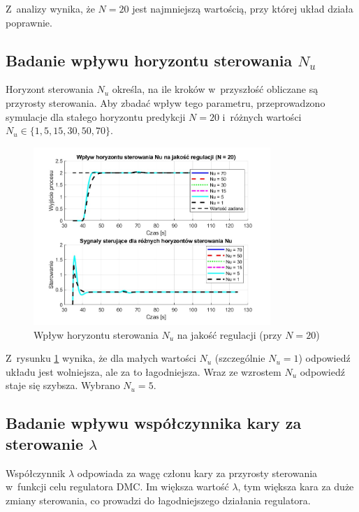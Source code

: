 \documentclass[a4paper,titlepage,11pt,floatssmall]{mwrep}
\begin{document}
Z~analizy wynika, że $N = 20$ jest najmniejszą wartością, przy której układ działa poprawnie.

\subsection{Badanie wpływu horyzontu sterowania $N_u$}

Horyzont sterowania $N_u$ określa, na ile kroków w~przyszłość obliczane są przyrosty sterowania. Aby zbadać wpływ tego parametru, przeprowadzono symulacje dla stałego horyzontu predykcji $N = 20$ i~różnych wartości $N_u \in \{1, 5, 15, 30, 50, 70\}$.

\begin{figure}[H]
    \centering
    \includegraphics[width=0.8\textwidth]{kod/wykresy/horyzont_sterowania_porownanie.jpg}
    \caption{Wpływ horyzontu sterowania $N_u$ na jakość regulacji (przy $N = 20$)}
    \label{fig:Nu_comparison}
\end{figure}

Z~rysunku \ref{fig:Nu_comparison} wynika, że dla małych wartości $N_u$ (szczególnie $N_u = 1$) odpowiedź układu jest wolniejsza, ale za to łagodniejsza. Wraz ze wzrostem $N_u$ odpowiedź staje się szybsza. Wybrano $N_u = 5$.

\subsection{Badanie wpływu współczynnika kary za sterowanie $\lambda$}

Współczynnik $\lambda$ odpowiada za wagę członu kary za przyrosty sterowania w~funkcji celu regulatora DMC. Im większa wartość $\lambda$, tym większa kara za duże zmiany sterowania, co prowadzi do łagodniejszego działania regulatora.
\end{document}
